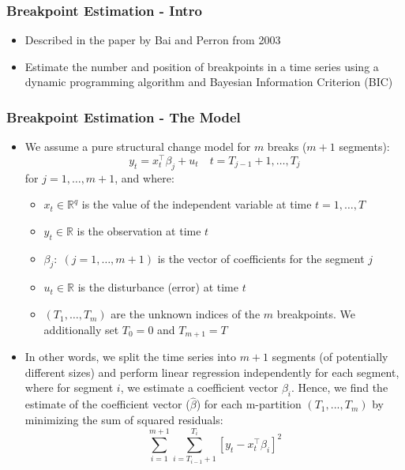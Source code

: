 \documentclass[presentation.tex]{subfiles}
\begin{document}
\begin{frame}
\frametitle{Breakpoint Estimation - Intro}
\begin{itemize}
  \item Described in the paper by Bai and Perron from 2003
  \item Estimate the number and position of breakpoints in a time series using
    a dynamic programming algorithm and Bayesian Information Criterion (BIC)
\end{itemize}
\end{frame}


\begin{frame}
\frametitle{Breakpoint Estimation - The Model}
\begin{itemize}
  \item 
We assume a pure structural change model for $m$ breaks ($m+1$ segments):
\[
y_{t} = x_{t}^{\top} \beta_{j}+u_{t} \quad t=T_{j-1}+1, \ldots, T_{j}
\]
for $j = 1,\hdots , m+1$, and where:
\vspace{2.5mm}
\begin{itemize}
\item $x_t \in \mathbb{R}^q$ is the value of the independent variable at time
  $t = 1,\hdots , T$
\item $y_{t} \in \mathbb{R}$ is the observation at time $t$
\item $\beta_j: \; (j=1, \hdots ,m+1)$ is the vector of coefficients for the segment $j$
\item $u_{t} \in \mathbb{R}$ is the disturbance (error) at time $t$
\item $(T_1, \hdots ,T_m)$ are the unknown indices of the $m$ breakpoints.
 We additionally set $T_0 = 0$ and $T_{m+1} = T$
\end{itemize}
\item 
In other words, we split the time series into $m+1$ segments (of potentially
different sizes) and perform linear
regression independently for each segment, where for segment $i$, we estimate
a coefficient vector $\beta_i$.
Hence, we find the estimate of the coefficient vector ($\hat{\beta}$) for each
m-partition $(T_1, ..., T_m)$ by minimizing the sum of squared residuals:
\[
\sum_{i=1}^{m+1}\sum_{i=T_{i-1} + 1}^{T_i} \left[ y_t - x_t^{\top}\beta_i \right]^2
\]
\end{itemize}
\end{frame}
\end{document}

